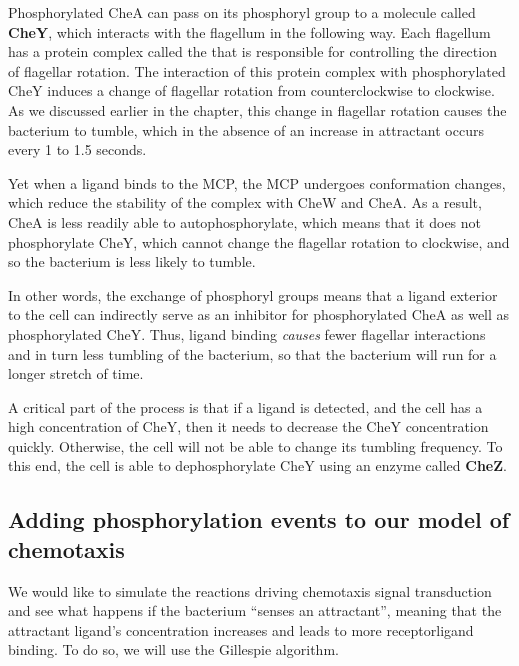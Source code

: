 Phosphorylated CheA can pass on its phosphoryl group to a molecule called \textbf{CheY}, which interacts with the flagellum in the following way. Each flagellum has a protein complex called the  that is responsible for controlling the direction of flagellar rotation. The interaction of this protein complex with phosphorylated CheY induces a change of flagellar rotation from counter\-clockwise to clockwise. As we discussed earlier in the chapter, this change in flagellar rotation causes the bacterium to tumble, which in the absence of an increase in attractant occurs every 1 to 1.5 seconds.

Yet when a ligand binds to the MCP, the MCP undergoes conformation changes, which reduce the stability of the complex with CheW and CheA. As a result, CheA is less readily able to autophosphorylate, which means that it does not phosphorylate CheY, which cannot change the flagellar rotation to clockwise, and so the bacterium is less likely to tumble.

In other words, the exchange of phosphoryl groups means that a ligand exterior to the cell can indirectly serve as an inhibitor for phosphorylated CheA as well as phosphorylated CheY. Thus, ligand binding \textit{causes} fewer flagellar interactions and in turn less tumbling of the bacterium, so that the bacterium will run for a longer stretch of time.

A critical part of the process is that if a ligand is detected, and the cell has a high concentration of CheY, then it needs to decrease the CheY concentration quickly. Otherwise, the cell will not be able to change its tumbling frequency. To this end, the cell is able to dephosphorylate CheY using an enzyme called \textbf{CheZ}.


\FloatBarrier
{}
\subsection{Adding phosphorylation events to our model of chemotaxis}


We would like to simulate the reactions driving chemotaxis signal transduction and see what happens if the bacterium ``senses an attractant'', meaning that the attractant ligand's concentration increases and leads to more receptor\-ligand binding. To do so, we will use the Gillespie algorithm.

